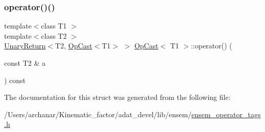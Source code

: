 \mbox{\label{structOpCast_a1a390481d419f2e62e4342c10ca6eabf}} 
\subsubsection{\texorpdfstring{operator()()}{operator()()}\hspace{0.1cm}{\footnotesize\ttfamily [2/2]}}
{\footnotesize\ttfamily template$<$class T1 $>$ \\
template$<$class T2 $>$ \\
\mbox{\hyperlink{structUnaryReturn}{Unary\+Return}}$<$T2, \mbox{\hyperlink{structOpCast}{Op\+Cast}}$<$T1$>$ $>$ \mbox{\hyperlink{structOpCast}{Op\+Cast}}$<$ T1 $>$\+::operator() (\begin{DoxyParamCaption}\item[{const T2 \&}]{a }\end{DoxyParamCaption}) const\hspace{0.3cm}{\ttfamily [inline]}}



The documentation for this struct was generated from the following file\+:\begin{DoxyCompactItemize}
\item 
/\+Users/archanar/\+Kinematic\+\_\+factor/adat\+\_\+devel/lib/ensem/\mbox{\hyperlink{lib_2ensem_2ensem__operator__tags_8h}{ensem\+\_\+operator\+\_\+tags.\+h}}\end{DoxyCompactItemize}
